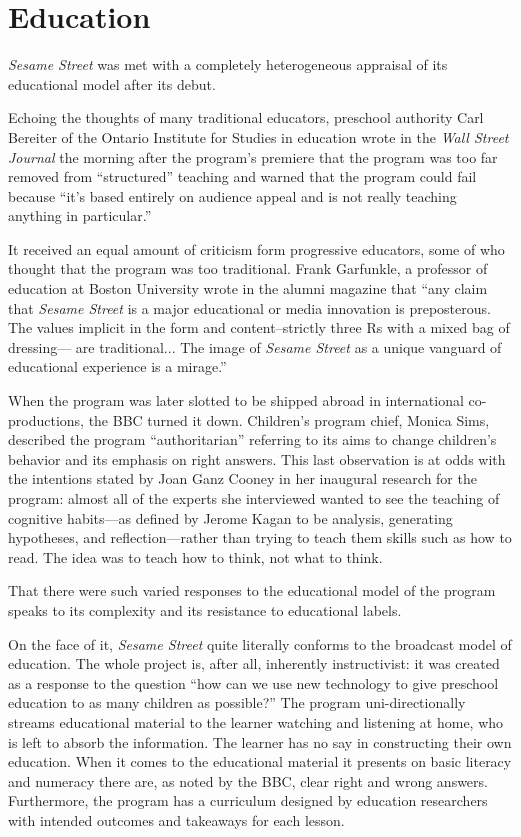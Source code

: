 \documentclass[12pt,letterpaper]{article}
\begin{document}
	\section*{Education}	
	

	\textit{Sesame Street} was met with a completely heterogeneous 
	appraisal of its educational model after its debut. 

	Echoing the thoughts of many traditional educators, preschool authority
	Carl Bereiter of the Ontario Institute for Studies in education wrote in
	the \textit{Wall Street Journal} the morning after the program's 
	premiere that the program was too far removed from ``structured'' 
	teaching and warned that the program could fail because ``it's based 
	entirely on audience appeal and is not really teaching anything in 
	particular.''\autocite[200]{Davis}

	It received an equal amount of criticism form progressive educators, 
	some of who thought that the program was too traditional. Frank 
	Garfunkle, a professor of education at Boston University wrote in the 
	alumni magazine that ``any claim that \textit{Sesame Street} is a major 
	educational or media innovation is preposterous. The values implicit in
	the form and content--strictly three Rs with a mixed bag of dressing---	
	are traditional... The image of \textit{Sesame Street} as a unique 
	vanguard of educational experience is a mirage.''\autocite[201]{Davis}

	When the program was later slotted to be shipped abroad in 
	international co-productions, the BBC turned it down. Children's 
	program chief, Monica Sims, described the program ``authoritarian'' 
	referring to its aims to change children's behavior and its emphasis on 
	right answers.\autocite[211]{Davis} This last observation is at odds
	with the intentions stated by Joan Ganz Cooney in her inaugural
	research for the program: almost all of the experts she interviewed 
	wanted to see the teaching of cognitive habits---as defined by Jerome 
	Kagan to be analysis, generating hypotheses, and reflection---rather 
	than trying to teach them skills such as how to read. The idea was to
	teach how to think, not what to think.\autocite[23]{Cooney}

	That there were such varied responses to the educational model of the
	program speaks to its complexity and its resistance to educational 
	labels. 
	
	On the face of it, \textit{Sesame Street} quite literally conforms to 
	the broadcast model of education. The whole project is, after all, 
	inherently instructivist: it was created as a response to the question
	``how can we use new technology to give preschool education to as many 
	children as possible?'' The program 
	uni-directionally streams educational material to the learner watching 
	and listening at home, who is left to absorb the information. The 
	learner has no say in constructing their own education. When it comes to
	the educational material it presents on basic literacy and numeracy 
	there are, as noted by the BBC, clear right and wrong answers. 
	Furthermore, the program has a curriculum 
	designed by education researchers with intended outcomes and takeaways 
	for each lesson.\autocite[117]{Davis} 
\end{document}
